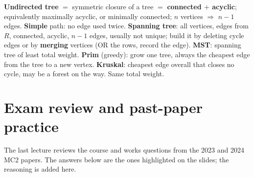 \documentclass{fkt-notes}
\theoremstyle{definition}
\begin{document}
\begin{keybox}[title=Key points (7.4--7.5)]
  \textbf{Undirected tree} $=$ symmetric closure of a tree $=$
  \textbf{connected $+$ acyclic}; equivalently maximally acyclic, or
  minimally connected; $n$ vertices $\Rightarrow$ $n-1$ edges.
  \textbf{Simple} path: no edge used twice. \textbf{Spanning tree}: all
  vertices, edges from $R$, connected, acyclic, $n-1$ edges, usually not
  unique; build it by deleting cycle edges or by \textbf{merging}
  vertices (OR the rows, record the edge). \textbf{MST}: spanning tree of
  least total weight. \textbf{Prim} (greedy): grow one tree, always the
  cheapest edge from the tree to a new vertex. \textbf{Kruskal}: cheapest
  edge overall that closes no cycle, may be a forest on the way. Same
  total weight.
\end{keybox}

\newpage
{}
{}
\section*{Exam review and past-paper practice}\label{sec:examreview}
%
The last lecture reviews the course and works questions from the 2023 and
2024 MC2 papers. The answers below are the ones highlighted on the slides;
the reasoning is added here.
\end{document}

